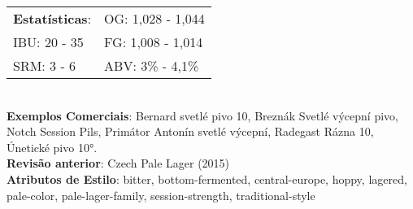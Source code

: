 \begin{tabular}{@{}p{35mm}p{35mm}@{}}
  \textbf{Estatísticas}: & OG: 1,028 - 1,044 \\
  IBU: 20 - 35  & FG: 1,008 - 1,014  \\
  SRM: 3 - 6   & ABV: 3\% - 4,1\%
\end{tabular}\\
\textbf{Exemplos Comerciais}: Bernard svetlé pivo 10, Breznák Svetlé výcepní pivo, Notch Session Pils, Primátor Antonín svetlé výcepní, Radegast Rázna 10, Únetické pivo 10°. \\
\textbf{Revisão anterior}: Czech Pale Lager (2015) \\
\textbf{Atributos de Estilo}: bitter, bottom-fermented, central-europe, hoppy, lagered, pale-color, pale-lager-family, session-strength, traditional-style
